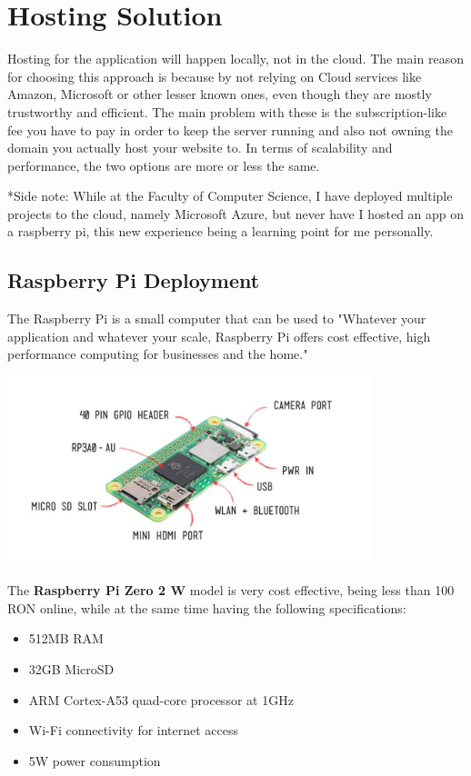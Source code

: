 \documentclass[12pt,a4paper]{report}
\begin{document}
\section{Hosting Solution}

Hosting for the application will happen locally, not in the cloud. The main reason for choosing this approach is because by not relying on Cloud services like Amazon, Microsoft or other lesser known ones, even though they are mostly trustworthy and efficient. The main problem with these is the subscription-like fee you have to pay in order to keep the server running and also not owning the domain you actually host your website to. In terms of scalability and performance, the two options are more or less the same.

*Side note: While at the Faculty of Computer Science, I have deployed multiple projects to the cloud, namely Microsoft Azure, but never have I hosted an app on a raspberry pi, this new experience being a learning point for me personally.

\subsection{Raspberry Pi Deployment}
The Raspberry Pi is a small computer that can be used to 
"Whatever your application and whatever your scale, Raspberry Pi offers cost effective, high performance computing for businesses and the home."~\cite{raspberryPi}

\begin{center}
\includegraphics[width=0.8\textwidth]{images/raspberrypi.png}
\end{center}

The \textbf{Raspberry Pi Zero 2 W} model is very cost effective, being less than 100 RON online, while at the same time having the following specifications:

\begin{itemize}
    \item 512MB RAM
    \item 32GB MicroSD
    \item ARM Cortex-A53 quad-core processor at 1GHz
    \item Wi-Fi connectivity for internet access
    \item 5W power consumption
\end{itemize}
\end{document}
